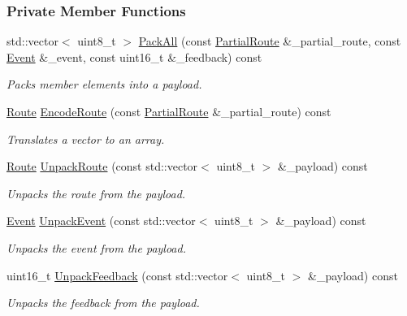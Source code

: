 \subsubsection*{Private Member Functions}
\begin{DoxyCompactItemize}
\item 
std\+::vector$<$ uint8\+\_\+t $>$ \hyperlink{classosse_1_1collaborate_1_1_packet_forward_a5f6bf9e22a6c956b08593eb35b149543}{Pack\+All} (const \hyperlink{classosse_1_1collaborate_1_1_packet_forward_a4627beb1294e822a7eec6038969a5da0}{Partial\+Route} \&\+\_\+partial\+\_\+route, const \hyperlink{classosse_1_1collaborate_1_1_packet_forward_a66c37a806c4b486cb1af64409865fa4b}{Event} \&\+\_\+event, const uint16\+\_\+t \&\+\_\+feedback) const
\begin{DoxyCompactList}\small\item\em Packs member elements into a payload. \end{DoxyCompactList}\item 
\hyperlink{classosse_1_1collaborate_1_1_packet_forward_a5b42a7c3605c5a6c7e0880599b213240}{Route} \hyperlink{classosse_1_1collaborate_1_1_packet_forward_a3c77c0ab27c74b52945244faf8ce3d5e}{Encode\+Route} (const \hyperlink{classosse_1_1collaborate_1_1_packet_forward_a4627beb1294e822a7eec6038969a5da0}{Partial\+Route} \&\+\_\+partial\+\_\+route) const
\begin{DoxyCompactList}\small\item\em Translates a vector to an array. \end{DoxyCompactList}\item 
\hyperlink{classosse_1_1collaborate_1_1_packet_forward_a5b42a7c3605c5a6c7e0880599b213240}{Route} \hyperlink{classosse_1_1collaborate_1_1_packet_forward_a34d3be1f164ab0b1ee52396c8e5ec2cc}{Unpack\+Route} (const std\+::vector$<$ uint8\+\_\+t $>$ \&\+\_\+payload) const
\begin{DoxyCompactList}\small\item\em Unpacks the route from the payload. \end{DoxyCompactList}\item 
\hyperlink{classosse_1_1collaborate_1_1_packet_forward_a66c37a806c4b486cb1af64409865fa4b}{Event} \hyperlink{classosse_1_1collaborate_1_1_packet_forward_a954b32499a8ca1e5d68da03b567dc2e3}{Unpack\+Event} (const std\+::vector$<$ uint8\+\_\+t $>$ \&\+\_\+payload) const
\begin{DoxyCompactList}\small\item\em Unpacks the event from the payload. \end{DoxyCompactList}\item 
uint16\+\_\+t \hyperlink{classosse_1_1collaborate_1_1_packet_forward_a4498a5e0e0c38145f88238df36ad815d}{Unpack\+Feedback} (const std\+::vector$<$ uint8\+\_\+t $>$ \&\+\_\+payload) const
\begin{DoxyCompactList}\small\item\em Unpacks the feedback from the payload. \end{DoxyCompactList}\end{DoxyCompactItemize}
